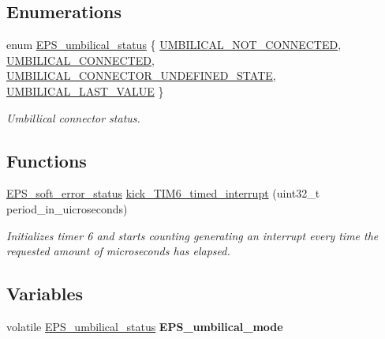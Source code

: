 \subsection*{Enumerations}
\begin{DoxyCompactItemize}
\item 
enum \hyperlink{group__eps__configuration_gab34d18603569318563da7959d65fb818}{E\-P\-S\-\_\-umbilical\-\_\-status} \{ \hyperlink{group__eps__configuration_ggab34d18603569318563da7959d65fb818a7547275eed623f8d6589a3fd10f48090}{U\-M\-B\-I\-L\-I\-C\-A\-L\-\_\-\-N\-O\-T\-\_\-\-C\-O\-N\-N\-E\-C\-T\-E\-D}, 
\hyperlink{group__eps__configuration_ggab34d18603569318563da7959d65fb818aa864d476529ba4d3749fce9ca7e263db}{U\-M\-B\-I\-L\-I\-C\-A\-L\-\_\-\-C\-O\-N\-N\-E\-C\-T\-E\-D}, 
\hyperlink{group__eps__configuration_ggab34d18603569318563da7959d65fb818a3fcc21b7ef23ac248c58a9db45947d64}{U\-M\-B\-I\-L\-I\-C\-A\-L\-\_\-\-C\-O\-N\-N\-E\-C\-T\-O\-R\-\_\-\-U\-N\-D\-E\-F\-I\-N\-E\-D\-\_\-\-S\-T\-A\-T\-E}, 
\hyperlink{group__eps__configuration_ggab34d18603569318563da7959d65fb818a6be8a1f55e84b93444bb75f74db86a63}{U\-M\-B\-I\-L\-I\-C\-A\-L\-\_\-\-L\-A\-S\-T\-\_\-\-V\-A\-L\-U\-E}
 \}
\begin{DoxyCompactList}\small\item\em Umbillical connector status. \end{DoxyCompactList}\end{DoxyCompactItemize}
\subsection*{Functions}
\begin{DoxyCompactItemize}
\item 
\hyperlink{group__softerror_ga82875cd4cc1b94ab7e638961c1b79e08}{E\-P\-S\-\_\-soft\-\_\-error\-\_\-status} \hyperlink{group__eps__configuration_gae1047d265564a0b60c266e6a0ba52408}{kick\-\_\-\-T\-I\-M6\-\_\-timed\-\_\-interrupt} (uint32\-\_\-t period\-\_\-in\-\_\-uicroseconds)
\begin{DoxyCompactList}\small\item\em Initializes timer 6 and starts counting generating an interrupt every time the requested amount of microseconds has elapsed. \end{DoxyCompactList}\end{DoxyCompactItemize}
\subsection*{Variables}
\begin{DoxyCompactItemize}
\item 
\hypertarget{group__eps__configuration_ga0997fc523dfaf4bcecc934fbcd7a4c08}{volatile \hyperlink{group__eps__configuration_gab34d18603569318563da7959d65fb818}{E\-P\-S\-\_\-umbilical\-\_\-status} {\bfseries E\-P\-S\-\_\-umbilical\-\_\-mode}}\label{group__eps__configuration_ga0997fc523dfaf4bcecc934fbcd7a4c08}

\end{DoxyCompactItemize}


